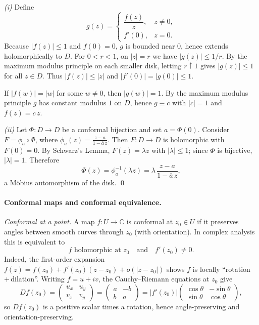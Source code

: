 \documentclass[11pt,a4paper]{article}
\theoremstyle{definition}
\theoremstyle{definition}
\theoremstyle{plain}
\theoremstyle{remark}
\begin{document}
\emph{(i)} Define
\[
g(z)=\begin{cases}
	\dfrac{f(z)}{z},& z\neq 0,\\[4pt]
	f'(0),& z=0.
\end{cases}
\]
Because $|f(z)|\le 1$ and $f(0)=0$, $g$ is bounded near $0$, hence extends holomorphically to $D$.
For $0<r<1$, on $|z|=r$ we have $|g(z)|\le 1/r$. By the maximum modulus principle on each smaller disk, letting $r\uparrow 1$ gives $|g(z)|\le 1$ for all $z\in D$.
Thus $|f(z)|\le |z|$ and $|f'(0)|=|g(0)|\le 1$.

If $|f(w)|=|w|$ for some $w\ne 0$, then $|g(w)|=1$. By the maximum modulus principle $g$ has constant modulus $1$ on $D$, hence $g\equiv c$ with $|c|=1$ and $f(z)=c\,z$.

\medskip
\emph{(ii)} Let $\Phi:D\to D$ be a conformal bijection and set $a=\Phi(0)$. Consider $F=\phi_a\circ \Phi$, where $\displaystyle \phi_a(z)=\frac{z-a}{1-\overline a\,z}$.
Then $F:D\to D$ is holomorphic with $F(0)=0$. By Schwarz's Lemma, $F(z)=\lambda z$ with $|\lambda|\le 1$; since $\Phi$ is bijective, $| \lambda|=1$.
Therefore
\[
\Phi(z)=\phi_a^{-1}(\lambda z)=\lambda\,\frac{z-a}{1-\overline a\,z},
\]
a Möbius automorphism of the disk.
\qed

\paragraph{Conformal maps and conformal equivalence.}

\emph{Conformal at a point.}
A map $f:U\to\mathbb C$ is conformal at $z_0\in U$ if it preserves angles between smooth curves through $z_0$ (with orientation). In complex analysis this is equivalent to
\[
f \text{ holomorphic at } z_0 \quad\text{and}\quad f'(z_0)\neq 0.
\]
Indeed, the first-order expansion $f(z)=f(z_0)+f'(z_0)(z-z_0)+o(|z-z_0|)$ shows $f$ is locally “rotation $+\,$dilation”. Writing $f=u+iv$, the Cauchy--Riemann equations at $z_0$ give
\[
Df(z_0)=
\begin{pmatrix}u_x & u_y\\ v_x & v_y\end{pmatrix}
=
\begin{pmatrix}a & -b\\ b & a\end{pmatrix}
=|f'(z_0)|
\begin{pmatrix}\cos\theta & -\sin\theta\\ \sin\theta & \cos\theta\end{pmatrix},
\]
so $Df(z_0)$ is a positive scalar times a rotation, hence angle-preserving and orientation-preserving.
\end{document}
